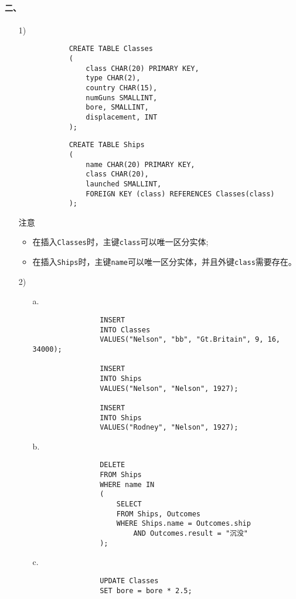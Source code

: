 \documentclass[10pt,a4paper]{article}
\begin{document}
    \paragraph{二、}
    \begin{enumerate}
        \item[1)]\begin{verbatim}
            CREATE TABLE Classes
            (
                class CHAR(20) PRIMARY KEY,
                type CHAR(2),
                country CHAR(15),
                numGuns SMALLINT,
                bore, SMALLINT,
                displacement, INT
            );
        \end{verbatim}
        
        \begin{verbatim}
            CREATE TABLE Ships
            (
                name CHAR(20) PRIMARY KEY,
                class CHAR(20),
                launched SMALLINT,
                FOREIGN KEY (class) REFERENCES Classes(class)
            );
        \end{verbatim}

        注意
        \begin{itemize}
            \item 在插入\texttt{Classes}时，主键\texttt{class}可以唯一区分实体;
            \item 在插入\texttt{Ships}时，主键\texttt{name}可以唯一区分实体，并且外键\texttt{class}需要存在。
        \end{itemize}
        \item[2)]\begin{itemize}
            \item[a.]\begin{verbatim}
                INSERT 
                INTO Classes
                VALUES("Nelson", "bb", "Gt.Britain", 9, 16, 34000);

                INSERT
                INTO Ships
                VALUES("Nelson", "Nelson", 1927);

                INSERT
                INTO Ships
                VALUES("Rodney", "Nelson", 1927);
            \end{verbatim}
            \item[b.]\begin{verbatim}
                DELETE
                FROM Ships
                WHERE name IN
                (
                    SELECT
                    FROM Ships, Outcomes
                    WHERE Ships.name = Outcomes.ship
                        AND Outcomes.result = "沉没"
                );
            \end{verbatim}
            \item[c.]\begin{verbatim}
                UPDATE Classes
                SET bore = bore * 2.5;


\end{verbatim}
\end{itemize}
\end{enumerate}
\end{document}
